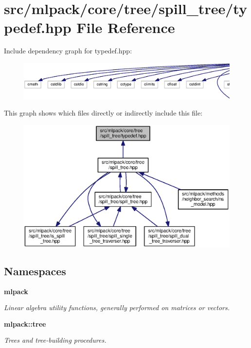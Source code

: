 \section{src/mlpack/core/tree/spill\+\_\+tree/typedef.hpp File Reference}
\label{core_2tree_2spill__tree_2typedef_8hpp}
Include dependency graph for typedef.\+hpp\+:
\nopagebreak
\begin{figure}[H]
\begin{center}
\leavevmode
\includegraphics[width=350pt]{core_2tree_2spill__tree_2typedef_8hpp__incl}
\end{center}
\end{figure}
This graph shows which files directly or indirectly include this file\+:
\nopagebreak
\begin{figure}[H]
\begin{center}
\leavevmode
\includegraphics[width=350pt]{core_2tree_2spill__tree_2typedef_8hpp__dep__incl}
\end{center}
\end{figure}
\subsection*{Namespaces}
\begin{DoxyCompactItemize}
\item 
 {\bf mlpack}
\begin{DoxyCompactList}\small\item\em Linear algebra utility functions, generally performed on matrices or vectors. \end{DoxyCompactList}\item 
 {\bf mlpack\+::tree}
\begin{DoxyCompactList}\small\item\em Trees and tree-\/building procedures. \end{DoxyCompactList}\end{DoxyCompactItemize}
